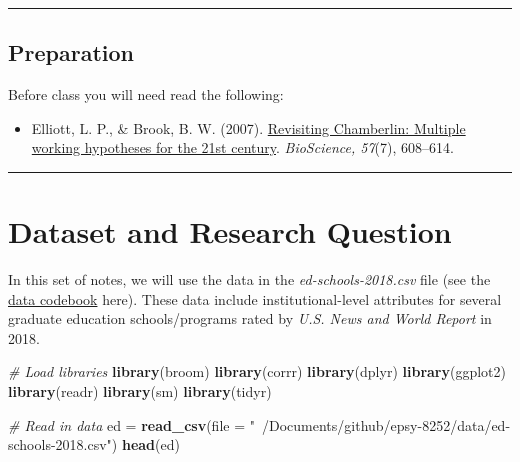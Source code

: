 \documentclass[]{book}
\newenvironment{Shaded}{\begin{snugshade}}{\end{snugshade}}
\newcommand{\CommentTok}[1]{\textcolor[rgb]{0.56,0.35,0.01}{\textit{#1}}}
\newcommand{\DataTypeTok}[1]{\textcolor[rgb]{0.13,0.29,0.53}{#1}}
\newcommand{\KeywordTok}[1]{\textcolor[rgb]{0.13,0.29,0.53}{\textbf{#1}}}
\newcommand{\NormalTok}[1]{#1}
\newcommand{\StringTok}[1]{\textcolor[rgb]{0.31,0.60,0.02}{#1}}
\providecommand{\tightlist}{%
  \setlength{\itemsep}{0pt}\setlength{\parskip}{0pt}}
\begin{document}
\begin{center}\rule{0.5\linewidth}{\linethickness}\end{center}

\hypertarget{preparation-5}{%
\subsection*{Preparation}\label{preparation-5}}

Before class you will need read the following:

\begin{itemize}
\tightlist
\item
  Elliott, L. P., \& Brook, B. W. (2007). \href{https://academic.oup.com/bioscience/article/57/7/608/238555}{Revisiting Chamberlin: Multiple working hypotheses for the 21st century}. \emph{BioScience, 57}(7), 608--614.
\end{itemize}

\begin{center}\rule{0.5\linewidth}{\linethickness}\end{center}

\hypertarget{dataset-and-research-question-4}{%
\section{Dataset and Research Question}\label{dataset-and-research-question-4}}

In this set of notes, we will use the data in the \emph{ed-schools-2018.csv} file (see the \protect\hyperlink{ed-schools-2018}{data codebook} here). These data include institutional-level attributes for several graduate education schools/programs rated by \emph{U.S. News and World Report} in 2018.

\begin{Shaded}
\begin{Highlighting}[]
\CommentTok{# Load libraries}
\KeywordTok{library}\NormalTok{(broom)}
\KeywordTok{library}\NormalTok{(corrr)}
\KeywordTok{library}\NormalTok{(dplyr)}
\KeywordTok{library}\NormalTok{(ggplot2)}
\KeywordTok{library}\NormalTok{(readr)}
\KeywordTok{library}\NormalTok{(sm)}
\KeywordTok{library}\NormalTok{(tidyr)}

\CommentTok{# Read in data}
\NormalTok{ed =}\StringTok{ }\KeywordTok{read_csv}\NormalTok{(}\DataTypeTok{file =} \StringTok{"~/Documents/github/epsy-8252/data/ed-schools-2018.csv"}\NormalTok{)}
\KeywordTok{head}\NormalTok{(ed)}
\end{Highlighting}
\end{Shaded}
\end{document}
